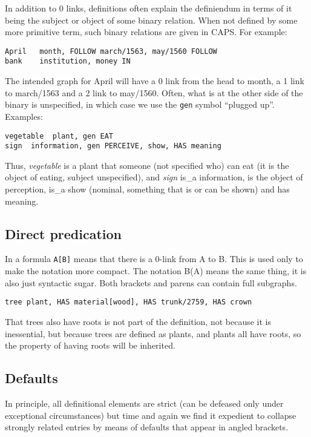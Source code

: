 \documentclass[11pt,bookmarks,bookmarksnumbered,naturalnames,plainpages=false,pdftex,colorlinks=true,urlcolor=blue,bookmarksdepth=subsection,plainpages=false]{paper}
\begin{document}
In addition to 0 links, definitions often explain the definiendum in terms of
it being the subject or object of some binary relation. When not defined by
some more primitive term, such binary relations are given in CAPS.  For
example:

\begin{verbatim}
April   month, FOLLOW march/1563, may/1560 FOLLOW
bank    institution, money IN
\end{verbatim}

\noindent
The intended graph for April will have a 0 link from the head to month, a 1
link to march/1563 and a 2 link to may/1560. Often, what is at the other side
of the binary is unspecified, in which case we use the {\tt gen} symbol ``plugged
up''.  Examples:

\begin{verbatim}
vegetable  plant, gen EAT
sign  information, gen PERCEIVE, show, HAS meaning
\end{verbatim}

\noindent
Thus, {\it vegetable} is a plant that someone (not specified who) can eat (it
is the object of eating, subject unspecified), and {\it sign} is\_a
information, is the object of perception, is\_a show (nominal, something that
is or can be shown) and has meaning.

\subsection{Direct predication}\label{isa}

In a formula {\tt A[B]} means that there is a 0-link from A to B. This is used
only to make the notation more compact. The notation B(A) means the same
thing, it is also just syntactic sugar. Both brackets and parens can contain
full subgraphs. 

\begin{verbatim}
tree plant, HAS material[wood], HAS trunk/2759, HAS crown 
\end{verbatim}

\noindent
That trees also have roots is not part of the definition, not because it is
inessential, but because trees are defined as plants, and plants all have
roots, so the property of having roots will be inherited.

\subsection{Defaults}\label{default}

In principle, all definitional elements are strict (can be defeased only under
exceptional circumstances) but time and again we find it expedient to collapse 
strongly related entries by means of defaults that appear in angled brackets. 
\end{document}
